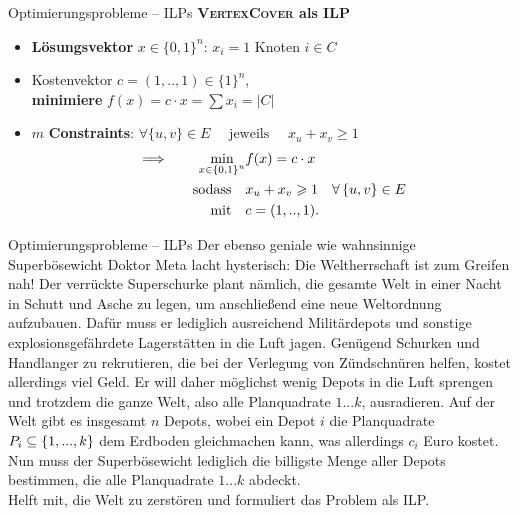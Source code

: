 \begin{frame}{Optimierungsprobleme – ILPs}
	\textbf{\textsc{VertexCover} als ILP} 
	\begin{itemize}
		\item \textbf{Lösungsvektor} $x \in \{0, 1\}^n$: \quad $x_i = 1$ \gdw Knoten $i \in C$ 
		\pause
		\item Kostenvektor $c = (1,..,1) \in \{1\}^n$, \\ 
		\textbf{minimiere} $f(x) = c \cdot x = \sum x_i = |C|$
		\pause
		\item $m$ \textbf{Constraints}: \quad  $\forall \{u, v\} \in E \quad \text{ jeweils } \quad x_u + x_v \geq 1$
		\pause 
		\begin{align*}
			{\Impl} \qquad \min_{x \in \set{0,1}^n} &f(x) = c \* x \\
			\text{sodass} \quad & x_u + x_v \geq 1 \quad \forall \set{u,v} \in E \\
			\text{mit} \quad & \text{$c = (1,..,1)$.} 
		\end{align*}
	\end{itemize}
\end{frame}

\iffalse
\begin{frame}<handout:0>{Optimierungsprobleme}
	\textbf{Zusammenfassung: Was haben wir heute gelernt?} 
	\begin{itemize}
		\item Verschiedene Verfahren für das Lösen von Optimierungsproblemen: Greedy, DP, ILP
		\pause
		\item TGI wird bestimmt super
		\pause
		\item Gruppenarbeit ist \textbf{megatoll} und überhaupt das \textbf{AllerBUÄSTE} von der \textbf{ganzön Welt}, deshalb sollten wir \textbf{unbedingt} jetzt gleich eine solche machön!!!1!
	\end{itemize}
\end{frame}
\fi

\begin{frame}{Optimierungsprobleme – ILPs}
	\vspace{-.3\baselineskip}
	Der ebenso geniale wie wahnsinnige Superbösewicht Doktor Meta lacht hysterisch: Die Weltherrschaft ist zum Greifen nah! Der verrückte Superschurke plant nämlich, die gesamte Welt in einer Nacht in Schutt und Asche zu legen, um anschließend eine neue Weltordnung aufzubauen. Dafür muss er lediglich ausreichend Militärdepots und sonstige explosionsgefährdete Lagerstätten in die Luft jagen. Genügend Schurken und Handlanger zu rekrutieren, die bei der Verlegung von Zündschnüren helfen, kostet allerdings viel Geld. Er will daher möglichst wenig Depots in die Luft sprengen und trotzdem die ganze Welt, also alle Planquadrate $1...k$, ausradieren. Auf der Welt gibt es insgesamt $n$ Depots, wobei ein Depot $i$ die Planquadrate $P_i \subseteq \left\{1,...,k\right\}$ dem Erdboden gleichmachen kann, was allerdings $c_i$ Euro kostet. Nun muss der Superbösewicht lediglich die billigste Menge aller Depots bestimmen, die alle Planquadrate $1...k$ abdeckt.  \\
	Helft mit, die Welt zu zerstören und formuliert das Problem als ILP.
\end{frame}

